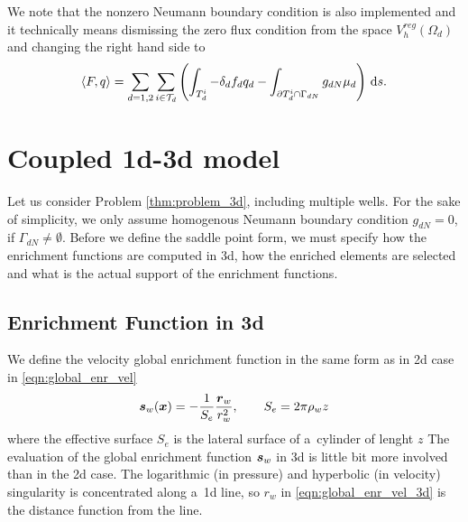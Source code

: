 We note that the nonzero Neumann boundary condition is also implemented and it
technically means dismissing the zero flux condition from the space $V^{reg}_h(\Omega_d)$
and changing the right hand side to
\begin{equation} \label{eqn:saddle_point_2d_nonzero_neumann}
 \langle F, q\rangle = \sum_{d=1,2}\sum_{i\in \mathcal T_d}\left(
        \int_{T_d^i} - \delta_d f_d q_d
        - \int_{\partial T_d^i\cap \Gamma_{dN}}
                 g_{dN} \mu_d\right) \,{\rm d} s.
\end{equation}




\section{Coupled 1d-3d model}
\label{sec:coupled_13d}
Let us consider Problem \ref{thm:problem_3d}, including multiple wells.
For the sake of simplicity, we only assume homogenous Neumann boundary condition $g_{dN}=0$, if $\Gamma_{dN}\neq\emptyset$.
Before we define the saddle point form, we must specify how the enrichment functions are computed in 3d,
how the enriched elements are selected and what is the actual support of the enrichment functions.


\subsection{Enrichment Function in 3d}
We define the velocity global enrichment function in the same form as in 2d case in \eqref{eqn:global_enr_vel}
\begin{equation}
    \mathbf{\boldsymbol{s}}_w(\mathbf{\boldsymbol{x}}) = -\frac{1}{S_e} \frac{\mathbf{\boldsymbol{r}}_w}{r_w^2}, \qquad S_e = 2\pi\rho_w z
    \label{eqn:global_enr_vel_3d}
\end{equation}
where the effective surface $S_e$ is the lateral surface of a~cylinder of lenght $z$
The evaluation of the global enrichment function $\mathbf{\boldsymbol{s}}_w$ in 3d is little bit more involved than in the 2d case.
The logarithmic (in pressure) and hyperbolic (in velocity) singularity is concentrated along a~1d line,
so $r_w$ in \eqref{eqn:global_enr_vel_3d} is the distance function from the line.

